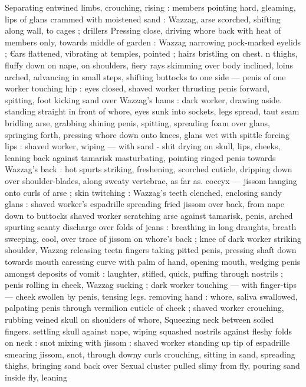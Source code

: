 {Separating entwined limbs, crouching, rising : members pointing 
hard, gleaming, lips of glans crammed with moistened sand : 
Wazzag, arse scorched, shifting along wall, to cages ; drillers 
Pressing close, driving whore back with heat of members only, 
towards middle of garden : Wazzag narrowing pock-marked eyelids ; 
€ars flattened, vibrating at temples, pointed ; hairs bristling on chest. 
n thighs, fluffy down on nape, on shoulders, fiery rays skimming 
over body inclined, loins arched, advancing in small steps, shifting 
buttocks to one side --- penis of one worker touching hip : eyes 
closed, shaved worker thrusting penis forward, spitting, foot kicking 
sand over Wazzag's hams : dark worker, drawing aside. standing 
straight in front of whore, eyes sunk into sockets, legs spread, taut 
seam bridling arse, grabbing shining penis, spitting, spreading foam 
over glans, springing forth, pressing whore down onto knees, glans 
wet with spittle forcing lips : shaved worker, wiping --- with sand - 
shit drying on skull, lips, cheeks, leaning back against tamarisk 
masturbating, pointing ringed penis towards Wazzag's back : hot 
spurts striking, freshening, scorched cuticle, dripping down over 
shoulder-blades, along sweaty vertebrae, as far as. coccyx --- jissom 
hanging onto curls of arse ; skin twitching : Wazzag's teeth 
clenched, enclosing sandy glans : shaved worker's espadrille 
spreading fried jissom over back, from nape down to buttocks 
shaved worker scratching arse against tamarisk, penis, arched 
spurting scanty discharge over folds of jeans : breathing in long 
draughts, breath sweeping, cool, over trace of jissom on whore's 
back ; knee of dark worker striking shoulder, Wazzag releasing teetn 
fingers taking pitted penis, pressing shaft down towards mouth 
caressing curve with palm of hand, opening mouth, wedging penis 
amongst deposits of vomit : laughter, stifled, quick, puffing through 
nostrils ; penis rolling in cheek, Wazzag sucking ; dark worker 
touching --- with finger-tips --- cheek swollen by penis, tensing legs. 
removing hand : whore, saliva swallowed, palpating penis through 
vermilion cuticle of cheek ; shaved worker crouching, rubbing veined 
skull on shoulders of whore, Squeezing neck between soiled fingers. 
settling skull against nape, wiping squashed nostrils against fleshy 
folds on neck : snot mixing with jissom : shaved worker standing up 
tip of espadrille smearing jissom, snot, through downy curls 
crouching, sitting in sand, spreading thighs, bringing sand back over 
Sexual cluster pulled slimy from fly, pouring sand inside fly, leaning 
}
